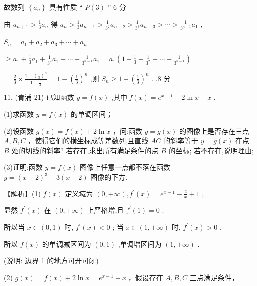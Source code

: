 \documentclass[10pt]{article}
\begin{document}
故数列 \(\left\{  {a}_{n}\right\}\) 具有性质 “ \(P\left( 3\right)\) ” 6 分

由 \({a}_{n + 1} > \frac{1}{3}{a}_{n}\) 得 \({a}_{n} > \frac{1}{3}{a}_{n - 1} > \frac{1}{{3}^{2}}{a}_{n - 2} > \frac{1}{{3}^{3}}{a}_{n - 3} > \cdots  > \frac{1}{{3}^{n - 1}}{a}_{1}\) ,

\({S}_{n} = {a}_{1} + {a}_{2} + {a}_{3} + \cdots  + {a}_{n}\)

\(\geq  {a}_{1} + \frac{1}{3}{a}_{1} + \frac{1}{{3}^{2}}{a}_{1} + \cdots  + \frac{1}{{3}^{n - 1}}{a}_{1} = {a}_{1}\left( {1 + \frac{1}{3} + \frac{1}{{3}^{2}} + \cdots  + \frac{1}{{3}^{n - 1}}}\right)\)

\(= \frac{2}{3} \times  \frac{1 - {\left( \frac{1}{3}\right) }^{n}}{1 - \frac{1}{3}} = 1 - {\left( \frac{1}{3}\right) }^{n}\) ,则 \({S}_{n} \geq  1 - {\left( \frac{1}{3}\right) }^{n}\) . .8 分

11. (青浦 21) 已知函数 \(y = f\left( x\right)\) ,其中 \(f\left( x\right)  = {e}^{x - 1} - 2\ln x + x\) .

(1)求函数 \(y = f\left( x\right)\) 的单调区间；

(2)设函数 \(g\left( x\right)  = f\left( x\right)  + 2\ln x\) ，问:函数 \(y = g\left( x\right)\) 的图像上是否存在三点 \(A,B,C\) ，使得它们的横坐标成等差数列,且直线 \({AC}\) 的斜率等于 \(y = g\left( x\right)\) 在点 \(B\) 处的切线的斜率? 若存在,求出所有满足条件的点 \(B\) 的坐标; 若不存在,说明理由;

(3)证明:函数 \(y = f\left( x\right)\) 图像上任意一点都不落在函数 \(y = {\left( x - 2\right) }^{3} - 3\left( {x - 2}\right)\) 图像的下方.

【解析】(1) \(f\left( x\right)\) 定义域为 \(\left( {0, + \infty }\right) ,{f}^{\prime }\left( x\right)  = {e}^{x - 1} - \frac{2}{x} + 1\) ,

显然 \({f}^{\prime }\left( x\right)\) 在 \(\left( {0, + \infty }\right)\) 上严格增,且 \({f}^{\prime }\left( 1\right)  = 0\) .

所以当 \(x \in  \left( {0,1}\right)\) 时, \({f}^{\prime }\left( x\right)  < 0\) ; 当 \(x \in  \left( {1, + \infty }\right)\) 时, \({f}^{\prime }\left( x\right)  > 0\) .

所以 \(f\left( x\right)\) 的单调减区间为 \(\left( {0,1}\right)\) ,单调增区间为 \(\left( {1, + \infty }\right)\) .

(说明: 边界 1 的地方可开可闭)

(2) \(g\left( x\right)  = f\left( x\right)  + 2\ln x = {e}^{x - 1} + x\) ，假设存在 \(A,B,C\) 三点满足条件，
\end{document}
